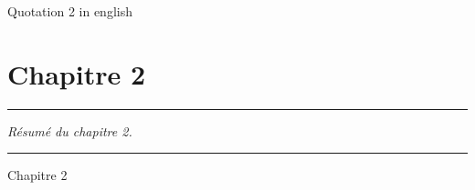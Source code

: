 
\lhead[\fancyplain{}{\leftmark}]%
      {\fancyplain{}{}} %
\chead[\fancyplain{}{}]%
      {\fancyplain{}{}}
\rhead[\fancyplain{}{}]%
      {\fancyplain{}{\rightmark}}%
\lfoot[\fancyplain{}{\thepage}]%
      {\fancyplain{}{}}
\cfoot[\fancyplain{}{}]%
      {\fancyplain{}{}} %
\rfoot[\fancyplain{}{}]%
     {\fancyplain{}{\thepage}}



\begin{savequote}[60mm]\foreignlanguage{english}{
Quotation 2 in english
}
\end{savequote}

\chapter{Chapitre 2}
\label{ch:2}


\begin{center}
\rule{0.7\linewidth}{.5pt}
\begin{minipage}{0.7\linewidth}
\smallskip

\textit{
Résumé du chapitre 2.
}

\end{minipage}
\smallskip
\rule{0.7\linewidth}{.5pt}
\end{center}
	
\adjustmtc[2]
\minitoc
\adjustmtc[-2]
\minilof
\minilot
\newpage


Chapitre 2